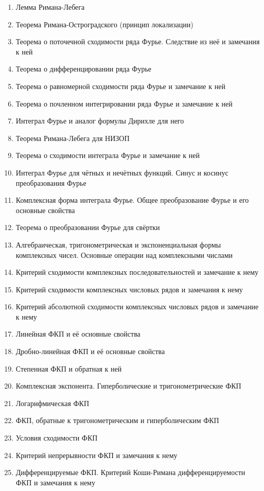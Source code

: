 \documentclass[../main.tex]{subfiles}
\begin{document}
\begin{enumerate}
    \item Лемма Римана-Лебега
    \item Теорема Римана-Остроградского (принцип локализации)
    \item Теорема о поточечной сходимости ряда Фурье. Следствие из неё и замечания к ней
    \item Теорема о дифференцировании ряда Фурье
    \item Теорема о равномерной сходимости ряда Фурье и замечание к ней
    \item Теорема о почленном интегрировании ряда Фурье и замечание к ней
    \item Интеграл Фурье и аналог формулы Дирихле для него
    \item Теорема Римана-Лебега для НИЗОП
    \item Теорема о сходимости интеграла Фурье и замечание к ней
    \item Интеграл Фурье для чётных и нечётных функций. Синус и косинус преобразования Фурье
    \item Комплексная форма интеграла Фурье. Общее преобразование Фурье и его основные свойства
    \item Теорема о преобразовании Фурье для свёртки
    \item Алгебраическая, тригонометрическая и экспоненциальная формы комплексных чисел. Основные операции над комплексными числами
    \item Критерий сходимости комплексных последовательностей и замечание к нему
    \item Критерий сходимости комплексных числовых рядов и замечания к нему
    \item Критерий абсолютной сходимости комплексных числовых рядов и замечание к нему
    \item Линейная ФКП и её основные свойства
    \item Дробно-линейная ФКП и её основные свойства
    \item Степенная ФКП и обратная к ней
    \item Комплексная экспонента. Гиперболические и тригонометрические ФКП
    \item Логарифмическая ФКП
    \item ФКП, обратные к тригонометрическим и гиперболическим ФКП
    \item Условия сходимости ФКП
    \item Критерий непрерывности ФКП и замечания к нему
    \item Дифференцируемые ФКП. Критерий Коши-Римана дифференцируемости ФКП и замечания к нему

\end{enumerate}
\end{document}

